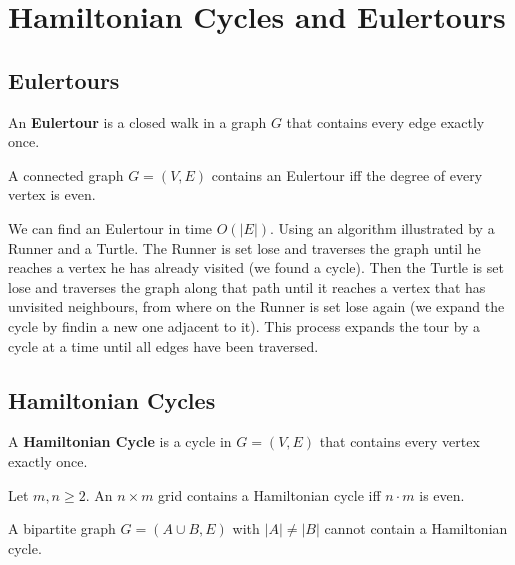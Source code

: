 \section{Hamiltonian Cycles and Eulertours}

\subsection{Eulertours}

\begin{definition}
    An \textbf{Eulertour} is a closed walk in a graph $G$ that contains every edge exactly once.
\end{definition}

\begin{theorem}
    A connected graph $G = (V, E)$ contains an Eulertour iff the degree of every vertex is even.
\end{theorem}

\begin{remark}
    We can find an Eulertour in time $O(|E|)$. Using an algorithm illustrated by a Runner and a Turtle. The
    Runner is set lose and traverses the graph until he reaches a vertex he has already visited (we found a
    cycle). Then the Turtle
    is set lose and traverses the graph along that path until it reaches a vertex that has unvisited neighbours,
    from where on the Runner is set lose again (we expand the cycle by findin a new one adjacent to it). This
    process expands the tour by a cycle at a time until all
    edges have been traversed.
\end{remark}

\subsection{Hamiltonian Cycles}

\begin{definition}
    A \textbf{Hamiltonian Cycle} is a cycle in $G = (V, E)$ that contains every vertex exactly once.
\end{definition}

\begin{theorem}
    Let $m, n \ge 2$. An $n \times m$ grid contains a Hamiltonian cycle iff $n \cdot m$ is even.
\end{theorem}

\begin{theorem}
    A bipartite graph $G = (A \cup B, E)$ with $|A| \neq |B|$ cannot contain a Hamiltonian cycle.
\end{theorem}

